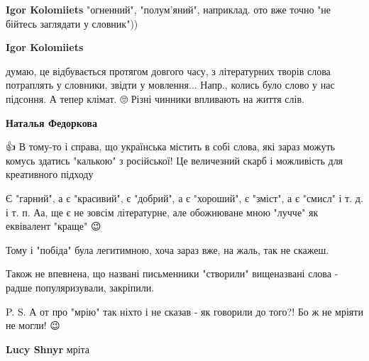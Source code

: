 \begin{itemize}
\begin{itemize}
\textbf{Igor Kolomiiets} "огненний", "полум'яний", наприклад. ото вже точно "не бійтесь заглядати у словник"))

 
\textbf{Igor Kolomiiets} 

думаю, це відбувається протягом довгого часу, з літературних творів слова
потраплять у словники, звідти у мовлення... Напр., колись було слово у нас
підсоння. А тепер клімат. 🙄 Різні чинники впливають на життя слів.


 
\textbf{Наталья Федоркова}

👍 В тому-то і справа, що українська містить в собі слова, які зараз можуть
комусь здатись "калькою" з російської! Це величезний скарб і можливість для
креативного підходу \Smiley[1.0][yellow]

Є "гарний", а є "красивий", є "добрий", а є "хороший", є "зміст", а є "смисл" і
т. д. і т. п. Аа, ще є не зовсім літературне, але обожнюване мною "лучче" як
еквівалент "краще" 😉

Тому і "побіда" була легитимною, хоча зараз вже, на жаль, так не скажеш.

Також не впевнена, що названі письменники "створили" вищеназвані слова - радше
популяризували, закріпили.

P. S. А от про "мрію" так ніхто і не сказав - як говорили до того?! Бо ж не
мріяти не могли! 😉

 
\textbf{Lucy Shnyr} мріта

 

\end{itemize}
\end{itemize}
